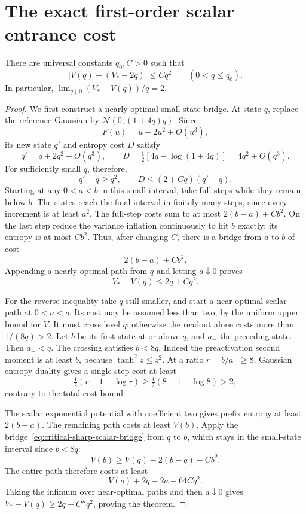 \section{The exact first-order scalar entrance cost}
\label{sec:critical-scalar-expansion}

\begin{theorem}
\label{thm:critical-scalar-expansion}
There are universal constants $q_0,C>0$ such that
\[
 \bigl|V(q)-(V_*-2q)\bigr|\le Cq^2
 \qquad(0<q\le q_0).
\]
In particular, $\lim_{q\downarrow0}(V_*-V(q))/q=2$.
\end{theorem}

\begin{proof}
We first construct a nearly optimal small-state bridge. At state
$q$, replace the reference Gaussian by
$\mathcal N(0,(1+4q)q)$. Since
\[
 F(u)=u-2u^2+O(u^3),
\]
its new state $q'$ and entropy cost $D$ satisfy
\[
 q'=q+2q^2+O(q^3),\qquad
 D=\tfrac12[4q-\log(1+4q)]=4q^2+O(q^3).
\]
For sufficiently small $q$, therefore,
\[
 q'-q\ge q^2,\qquad
 D\le(2+Cq)(q'-q).
\]
Starting at any $0<a<b$ in this small interval, take full steps
while they remain below $b$. The states reach the final interval
in finitely many steps, since every increment is at least $a^2$.
The full-step costs sum to at most
$2(b-a)+Cb^2$. On the last step reduce the variance inflation
continuously to hit $b$ exactly; its entropy is at most $Cb^2$.
Thus, after changing $C$, there is a bridge from $a$ to $b$ of cost
\begin{equation}\label{eq:critical-sharp-scalar-bridge}
 2(b-a)+Cb^2.
\end{equation}
Appending a nearly optimal path from $q$ and letting $a\downarrow0$
proves
\[
 V_*-V(q)\le2q+Cq^2.
\]

For the reverse inequality take $q$ still smaller, and start a
near-optimal scalar path at $0<a<q$. Its cost may be assumed less
than two, by the uniform upper bound for $V$. It must cross level
$q$: otherwise the readout alone costs more than $1/(8q)>2$.
Let $b$ be its first state at or above $q$, and $a_-$ the preceding
state. Then $a_-<q$. The crossing satisfies $b<8q$. Indeed the
preactivation second moment is at least $b$, because
$\tanh^2z\le z^2$. At a ratio $r=b/a_-\ge8$, Gaussian entropy
duality gives a single-step cost at least
\[
 \tfrac12(r-1-\log r)
 \ge\tfrac12(8-1-\log8)>2,
\]
contrary to the total-cost bound.

The scalar exponential potential with coefficient two gives prefix
entropy at least $2(b-a)$. The remaining path costs at least $V(b)$.
Apply the bridge~\eqref{eq:critical-sharp-scalar-bridge} from $q$
to $b$, which stays in the small-state interval since $b<8q$:
\[
 V(b)\ge V(q)-2(b-q)-Cb^2.
\]
The entire path therefore costs at least
\[
 V(q)+2q-2a-64Cq^2.
\]
Taking the infimum over near-optimal paths and then $a\downarrow0$
gives $V_*-V(q)\ge2q-C''q^2$, proving the theorem.
\end{proof}

